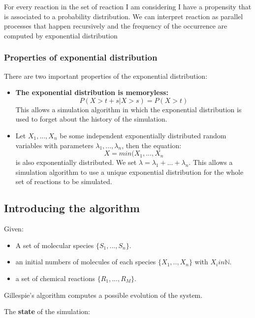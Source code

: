 For every reaction in the set of reaction I am considering I have a propensity that is associated to a probability distribution. We can interpret reaction as parallel processes that happen recursively and the frequency of the occurrence are computed by exponential distribution

\subsubsection{Properties of exponential distribution}
There are two important properties of the exponential distribution:
\begin{itemize}
    \item \textbf{The exponential distribution is memoryless:}
        \begin{equation*}
            P(X > t + s | X > s) = P (X > t)
        \end{equation*}
        This allows a simulation algorithm in which the exponential distribution is used to forget about the history of the simulation.

    \item Let $X_{1}, ..., X_{n}$ be some independent exponentially distributed random variables with parameters $\lambda_{1}, ..., \lambda_{n}$, then the equation:
        \begin{equation*}
            X = min(X_{1}, ..., X_{n}
        \end{equation*}
        is also exponentially distributed.
        We set $\lambda = \lambda_{1} + ... + \lambda_{n}$. This allows a simulation algorithm to use a unique exponential distribution for the whole set of reactions to be simulated.    
\end{itemize}

\subsection{Introducing the algorithm}
Given:
\begin{itemize}
    \item A set of molecular species $\{S_{1}, ..., S_{n}\}$.
    \item an initial numbers of molecules of each species $\{X_{1}, .., X_{n}\}$ with $X_{i} in \mathbb{N}$.
    \item a set of chemical reactions $\{R_{1}, ..., R_{M}\}$.
\end{itemize}
Gillespie's algorithm computes a possible evolution of the system.\par
The \textbf{state} of the simulation:

